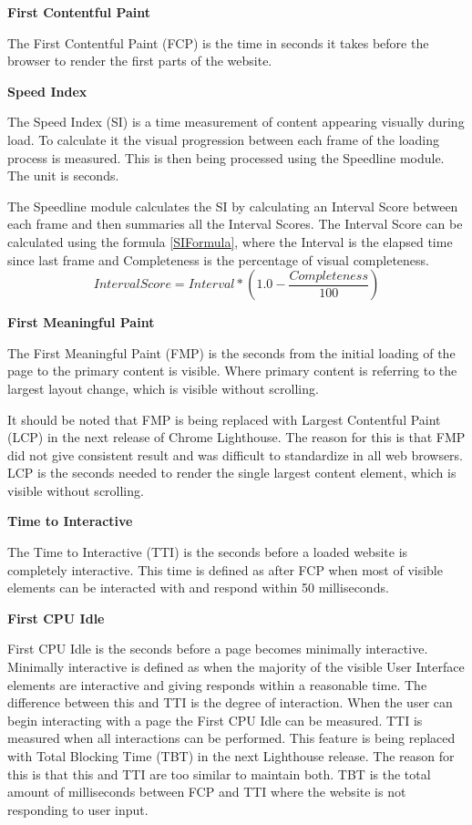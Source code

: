 

\textbf{First Contentful Paint}

The First Contentful Paint (FCP) is the time in seconds it takes before the browser to render the first parts of the website. 
\citep{FCP}


\textbf{Speed Index}

The Speed Index (SI) is a time measurement of content appearing visually during load. To calculate it the visual progression between each frame of the loading process is measured. This is then being processed using the Speedline module. The unit is seconds. \citep{PerSI}

The Speedline module calculates the SI by calculating an Interval Score between each frame and then summaries all the Interval Scores. The Interval Score can be calculated using the formula \ref{SIFormula}, where the Interval is the elapsed time since last frame and Completeness is the percentage of visual completeness. \citep{SIformula}
\begin{equation}
 IntervalScore = Interval * \left( 1.0 - \frac{Completeness}{100} \right)
\end{equation}\label{SIFormula}


\textbf{First Meaningful Paint}

The First Meaningful Paint (FMP) is the seconds from the initial loading of the page to the primary content is visible. Where primary content is referring to the largest layout change, which is visible without scrolling.

It should be noted that FMP is being replaced with Largest Contentful Paint (LCP) in the next release of Chrome Lighthouse. The reason for this is that FMP did not give consistent result and was difficult to standardize in all web browsers. \citep{FMP}
LCP is the seconds needed to render the single largest content element, which is visible without scrolling.\citep{LCP}

\textbf{Time to Interactive}

The Time to Interactive (TTI) is the seconds before a loaded website is completely interactive. This time is defined as after FCP when most of visible elements can be interacted with and respond within 50 milliseconds. 
\citep{TTI}

\textbf{First CPU Idle}

First CPU Idle is the seconds before a page becomes minimally interactive. Minimally interactive is defined as when the majority of the visible User Interface elements are interactive and giving responds within a reasonable time. 
The difference between this and TTI is the degree of interaction. When the user can begin interacting with a page the First CPU Idle can be measured. TTI is measured when all interactions can be performed. 
This feature is being replaced with Total Blocking Time (TBT) in the next Lighthouse release. The reason for this is that this and TTI are too similar to maintain both. 
\citep{FCPUI}
TBT is the total amount of milliseconds between FCP and TTI where the website is not responding to user input.
\citep{TBT}

